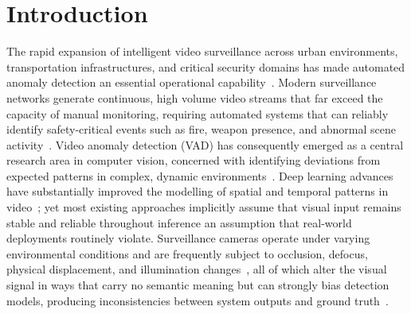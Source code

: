 \documentclass[sensors,article,submit,pdftex,moreauthors]{Definitions/mdpi}
\begin{document}

\section{Introduction}
 
The rapid expansion of intelligent video surveillance across urban environments, transportation infrastructures, and critical security domains has made automated anomaly detection an essential operational capability~\cite{duong2023deep,yuan2024surveillance}. Modern surveillance networks generate continuous, high volume video streams that far exceed the capacity of manual monitoring, requiring automated systems that can reliably identify safety-critical events such as fire, weapon presence, and abnormal scene activity~\cite{jebur2025scalable,ramachandra2020survey}. Video anomaly detection (VAD) has consequently emerged as a central research area in computer vision, concerned with identifying deviations from expected patterns in complex, dynamic environments~\cite{hasan2016anomaly,liu2023video}. Deep learning advances have substantially improved the modelling of spatial and temporal patterns in video~\cite{georgescu2021anomaly,park2023memory,park2020learning,cai2021appearance}; yet most existing approaches implicitly assume that visual input remains stable and reliable throughout inference an assumption that real-world deployments routinely violate. Surveillance cameras operate under varying environmental conditions and are frequently subject to occlusion, defocus, physical displacement, and illumination changes~\cite{diwan2024systematic,tyagi2023detailed}, all of which alter the visual signal in ways that carry no semantic meaning but can strongly bias detection models, producing inconsistencies between system outputs and ground truth~\cite{goswami2023hybrid}.
 
\end{document}

